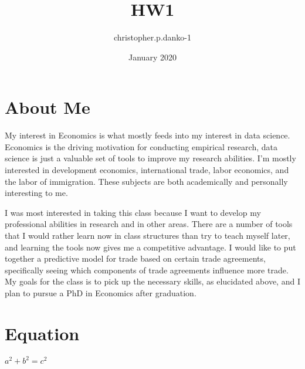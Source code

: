 \documentclass{article}
\title{HW1}
\author{christopher.p.danko-1 }
\date{January 2020}
\begin{document}
\maketitle

\section{About Me}
My interest in Economics is what mostly feeds into my interest in data science. Economics is the driving motivation for conducting empirical research, data science is just a valuable set of tools to improve my research abilities. I'm mostly interested in development economics, international trade, labor economics, and the labor of immigration. These subjects are both academically and personally interesting to me. 

I was most interested in taking this class because I want to develop my professional abilities in research and in other areas. There are a number of tools that I would rather learn now in class structures than try to teach myself later, and learning the tools now gives me a competitive advantage. I would like to put together a predictive model for trade based on certain trade agreements, specifically seeing which components of trade agreements influence more trade. My goals for the class is to pick up the necessary skills, as elucidated above, and I plan to pursue a PhD in Economics after graduation. 


\section{Equation}
$a^2+b^2=c^2$
\end{document}
